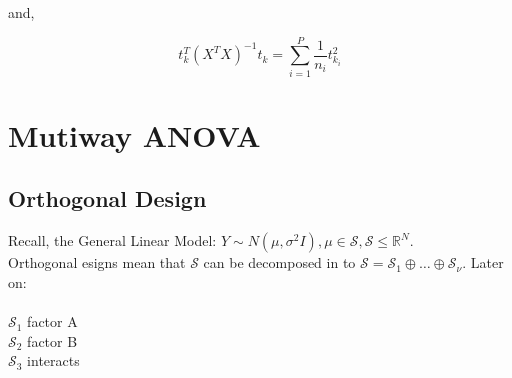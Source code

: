\documentclass[11pt,fleqn]{book} %
\begin{document}
and, 

		$$t^T_k(X^T X)^{-1} t_k = \displaystyle \sum^P_{i=1} \frac{1}{n_i}t^2_{k_i} $$










\chapter{Mutiway ANOVA}

\section{Orthogonal Design}





Recall, the General Linear Model: $Y \sim N(\mu, \sigma^2 I), \mu \in \mathcal{S}, \mathcal{S} \leq \mathbb{R}^N$. \\


Orthogonal esigns mean that $\mathcal{S}$ can be decomposed in to $\mathcal{S} = \mathcal{S}_1 \oplus \dots \oplus \mathcal{S}_\nu$. Later on:\\
\\
$\mathcal{S}_1$ factor A\\
$\mathcal{S}_2$ factor B\\
$\mathcal{S}_3$ interacts\\
\end{document}

